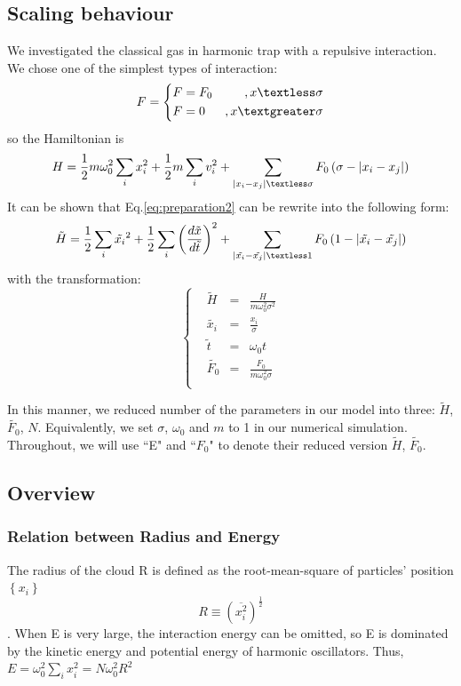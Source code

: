 \documentclass[aps,pre,twocolumn,groupedaddress]{revtex4-1}
\begin{document}
\subsection{Scaling behaviour}
We investigated the classical gas in harmonic trap with a repulsive interaction. We chose one of the simplest types of interaction:
\begin{equation}
F=\left\lbrace
\begin{aligned}
&F=F_0 	&,x\textless\sigma\\
&F=0 	&,x\textgreater\sigma
\end{aligned}
\right.
\label{eq:preparation1}
\end{equation}
so the Hamiltonian is
\begin{equation}
H=\frac{1}{2}m\omega_0^2\sum_{i}x_i^2+\frac{1}{2}m\sum_i v_i^2+\sum_{\left|x_i-x_j\right|\textless\sigma}F_0\left(\sigma-\left|x_i-x_j\right|\right)
\label{eq:preparation2}
\end{equation}
It can be shown that Eq.\ref{eq:preparation2} can be rewrite into the following form:
\begin{equation}
\tilde{H}=\frac{1}{2}\sum_{i}\tilde{x_i}^2+\frac{1}{2}\sum_i\left(\frac{d\tilde{x}}{d\tilde{t}}\right)^2+\sum_{\left|\tilde{x_i}-\tilde{x_j}\right|\textless 1}F_0\left(1-\left|\tilde{x_i}-\tilde{x_j}\right|\right)
\end{equation}
with the transformation:
\begin{equation}
\left\lbrace
\begin{aligned}
&\tilde{H}&=&\frac{H}{m\omega_0^2\sigma^2}\\
&\tilde{x_i}&=&\frac{x_i}{\sigma}\\
&\tilde{t}&=&\omega_0t\\
&\tilde{F_0}&=&\frac{F_0}{m\omega_0^2\sigma}\\
\end{aligned}
\right.
\end{equation}

In this manner, we reduced number of the parameters in our model into three: $\tilde{H}$, $\tilde{F_0}$, $N$. Equivalently, we set $\sigma$, $\omega_0$ and $m$ to 1 in our numerical simulation. Throughout, we will use ``E" and ``$F_0$" to denote their reduced version  $\tilde{H}$, $\tilde{F_0}$.

\subsection{Overview}
\subsubsection{Relation between Radius and Energy}
The radius of the cloud R is defined as the root-mean-square of particles' position $\left\lbrace x_i\right\rbrace$
\begin{equation}
R\equiv\left(\overline{x_i^2}\right)^\frac{1}{2}
\label{eq:def_of_R}
\end{equation}. When E is very large, the interaction energy can be omitted, so E is dominated by the kinetic energy and potential energy of harmonic oscillators. Thus, $E=\omega_0^2\sum_{i}x_i^2=N\omega_0^2R^2$ 
\end{document}
